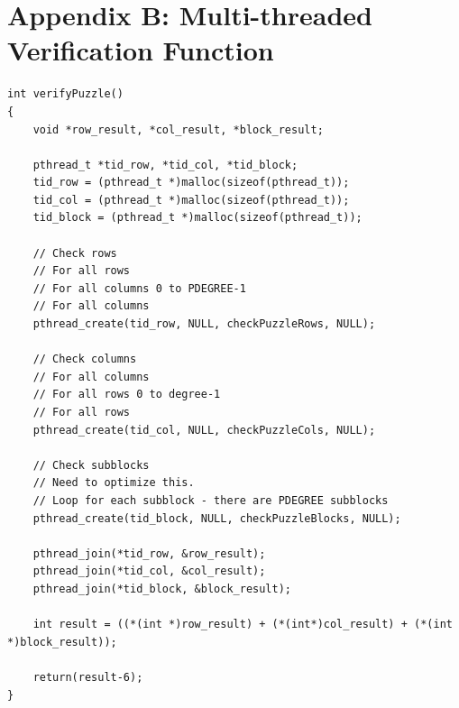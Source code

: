 \documentclass[11pt, a4paper]{article} %
\begin{document}
\section*{Appendix B: Multi-threaded Verification Function}
\linespread{1}
\begin{verbatim}
int verifyPuzzle()
{
    void *row_result, *col_result, *block_result;

    pthread_t *tid_row, *tid_col, *tid_block;
    tid_row = (pthread_t *)malloc(sizeof(pthread_t));
    tid_col = (pthread_t *)malloc(sizeof(pthread_t));
    tid_block = (pthread_t *)malloc(sizeof(pthread_t));

    // Check rows
    // For all rows
    // For all columns 0 to PDEGREE-1
    // For all columns  
    pthread_create(tid_row, NULL, checkPuzzleRows, NULL);

    // Check columns
    // For all columns
    // For all rows 0 to degree-1
    // For all rows  
    pthread_create(tid_col, NULL, checkPuzzleCols, NULL);

    // Check subblocks
    // Need to optimize this.
    // Loop for each subblock - there are PDEGREE subblocks
    pthread_create(tid_block, NULL, checkPuzzleBlocks, NULL);

    pthread_join(*tid_row, &row_result);
    pthread_join(*tid_col, &col_result);
    pthread_join(*tid_block, &block_result);

    int result = ((*(int *)row_result) + (*(int*)col_result) + (*(int *)block_result));

    return(result-6);
}
\end{verbatim}
\linespread{1.5}
\end{document}
